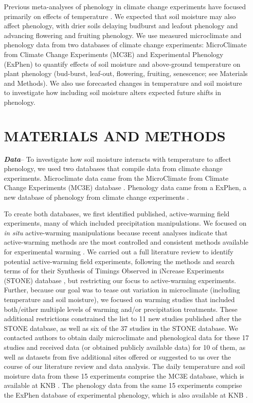 \documentclass{article}
\begin{document}
\par Previous meta-analyses of phenology in climate change experiments have focused primarily on effects of temperature \citep{wolkovich2012}. We expected that soil moisture may also affect phenology, with drier soils delaying budburst and leafout phenology and advancing flowering and fruiting phenology.  We use measured microclimate and phenology data from two databases of climate change experiments: MicroClimate from Climate Change Experiments (MC3E) and Experimental Phenology (ExPhen)  to quantify effects of soil moisture and above-ground temperature on plant phenology (bud-burst, leaf-out, flowering, fruiting, senescence; see Materials and Methods). We also use forecasted changes in temperature and soil moisture to investigate how including soil moisture alters expected future shifts in phenology. 

\section* {MATERIALS AND METHODS}
\textbf {\emph{Data}}-- To investigate how soil moisture interacts with temperature to affect phenology, we used two databases that compile data from climate change experiments. Microclimate data came from the  MicroClimate from Climate Change Experiments (MC3E) database \cite{ettinger2018}. Phenology data came from a ExPhen, a new database of phenology from climate change experiments \cite{ettinger2020}. 
\par To create both databases, we first identified published, active-warming field experiments, many of which included precipitation manipulations. We focused on \textit{in situ} active-warming manipulations because recent analyses indicate that active-warming methods are the most controlled and consistent methods available for experimental warming \citep{kimball2005,kimball2008,aronson2009,wolkovich2012}. We carried out a full literature review to identify potential active-warming field experiments, following the methods and search terms of \citet{wolkovich2012} for their Synthesis of Timings Observed in iNcrease Experiments (STONE) database \citep{wolkovich2012}, but restricting our focus to active-warming experiments. Further, because our goal was to tease out variation in microclimate (including temperature and soil moisture), we focused on warming studies that included both/either multiple levels of warming and/or precipitation treatments. These additional restrictions constrained the list to 11 new studies published after the STONE database, as well as six of the 37 studies in the STONE database. We contacted authors to obtain daily microclimate and phenological data for these 17 studies and received data (or obtained publicly available data) for 10 of them, as well as datasets from five additional sites offered or suggested to us over the course of our literature review and data analysis. The daily temperature and soil moisture data from these 15 experiments comprise the MC3E database, which is available at KNB \citep{ettinger2018}. The phenology data from the same 15 experiments comprise the ExPhen database of experimental phenology, which is also available at KNB \citep{ettinger2018b}.
\end{document}
